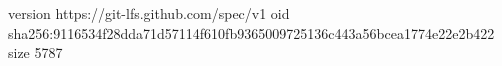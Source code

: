 version https://git-lfs.github.com/spec/v1
oid sha256:9116534f28dda71d57114f610fb9365009725136c443a56bcea1774e22e2b422
size 5787
